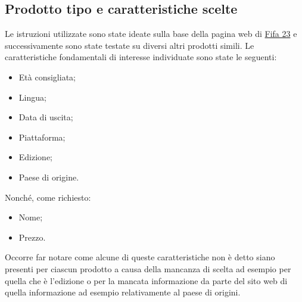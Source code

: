 \documentclass[12pt, letterpaper]{article}
\begin{document}
\subsection{Prodotto tipo e caratteristiche scelte}
Le istruzioni utilizzate sono state ideate sulla base della pagina web di \href{https://www.amazon.it/FIFA-23-Standard-PS4-Italiano/dp/B0B6CKCTXH/ref=sr_1_1?keywords=fifa+23+ps4&qid=1668615637&qu=eyJxc2MiOiIxLjU2IiwicXNhIjoiMC43NSIsInFzcCI6IjAuMzMifQ%3D%3D&sprefix=fifa%2Caps%2C152&sr=8-1}{Fifa 23} e successivamente sono state testate su diversi altri prodotti simili. Le caratteristiche fondamentali di interesse individuate sono state le seguenti:
 \begin{itemize}
    \item Età consigliata;
    \item Lingua;
    \item Data di uscita;
    \item Piattaforma;
    \item Edizione;
    \item Paese di origine.
\end{itemize}
Nonché, come richiesto:
\begin{itemize}
    \item Nome;
    \item Prezzo.
\end{itemize}
Occorre far notare come alcune di queste caratteristiche non è detto siano presenti per ciascun prodotto a causa della mancanza di scelta ad esempio per quella che è l'edizione o per la mancata informazione da parte del sito web di quella informazione ad esempio relativamente al paese di origini.
\end{document}
